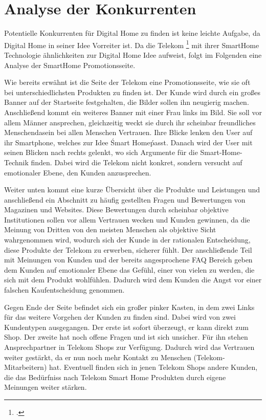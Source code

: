 \section{Analyse der Konkurrenten}
Potentielle Konkurrenten für Digital Home zu finden ist keine leichte Aufgabe, da Digital Home in seiner Idee Vorreiter ist. Da die Telekom \footcite[Website der Telekom:][]{Tkom} mit ihrer SmartHome Technologie ähnlichkeiten zur Digital Home Idee aufweist, folgt im Folgenden eine Analyse der SmartHome Promotionsseite.

Wie bereits erwähnt ist die Seite der Telekom eine Promotionsseite, wie sie oft bei unterschiedlichsten Produkten zu finden ist. Der Kunde wird durch ein großes Banner auf der Startseite festgehalten, die Bilder sollen ihn neugierig machen. Anschließend kommt ein weiteres Banner mit einer Frau links im Bild. Sie soll vor allem Männer ansprechen, gleichzeitig weckt sie durch ihr scheinbar freundliches Menschendasein bei allen Menschen Vertrauen. Ihre Blicke lenken den User auf ihr Smartphone, welches zur Idee \'Smart Home\' passt. Danach wird der User mit seinen Blicken nach rechts gelenkt, wo sich Argumente für die Smart-Home-Technik finden. Dabei wird die Telekom nicht konkret, sondern versucht auf emotionaler Ebene, den Kunden anzusprechen.

Weiter unten kommt eine kurze Übersicht über die Produkte und Leistungen und anschließend ein Abschnitt zu häufig gestellten Fragen und Bewertungen von Magazinen und Websites. Diese Bewertungen durch scheinbar objektive Institutionen sollen vor allem Vertrauen wecken und Kunden gewinnen, da die Meinung von Dritten von den meisten Menschen als objektive Sicht wahrgenommen wird, wodurch sich der Kunde in der rationalen Entscheidung, diese Produkte der Telekom zu erwerben, sicherer fühlt. Der anschließende Teil mit Meinungen von Kunden und der bereits angesprochene FAQ Bereich geben dem Kunden auf emotionaler Ebene das Gefühl, einer von vielen zu werden, die sich mit dem Produkt wohlfühlen. Dadurch wird dem Kunden die Angst vor einer falschen Kaufentscheidung genommen.

Gegen Ende der Seite befindet sich ein großer pinker Kasten, in dem zwei Links für das weitere Vorgehen der Kunden zu finden sind. Dabei wird von zwei Kundentypen ausgegangen. Der erste ist sofort überzeugt, er kann direkt zum Shop. Der zweite hat noch offene Fragen und ist sich unsicher. Für ihn stehen Ansprechpartner in Telekom Shops zur Verfügung. Dadurch wird das Vertrauen weiter gestärkt, da er nun noch mehr Kontakt zu Menschen (Telekom-Mitarbeitern) hat. Eventuell finden sich in jenen Telekom Shops andere Kunden, die das Bedürfniss nach Telekom Smart Home Produkten durch eigene Meinungen weiter stärken.

